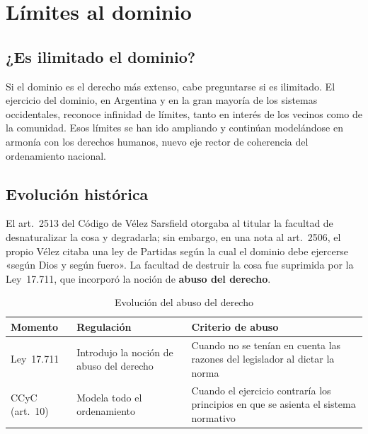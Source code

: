 \documentclass[12pt,oneside]{book}
\begin{document}
\chapter[Límites al dominio]{Límites al dominio}\label{cap:limites}

\section{¿Es ilimitado el dominio?}

Si el dominio es el derecho más extenso, cabe preguntarse si es ilimitado. El ejercicio del dominio, en Argentina y en la gran mayoría de los sistemas occidentales, reconoce infinidad de límites, tanto en interés de los vecinos como de la comunidad. Esos límites se han ido ampliando y continúan modelándose en armonía con los derechos humanos, nuevo eje rector de coherencia del ordenamiento nacional.

\section{Evolución histórica}

El art.~2513 del Código de Vélez Sarsfield otorgaba al titular la facultad de desnaturalizar la cosa y degradarla; sin embargo, en una nota al art.~2506, el propio Vélez citaba una ley de Partidas según la cual el dominio debe ejercerse «según Dios y según fuero». La facultad de destruir la cosa fue suprimida por la Ley~17.711, que incorporó la noción de \textbf{abuso del derecho}.

\begin{table}[H]
\centering
\small
\begin{tabularx}{\textwidth}{>{\raggedright\arraybackslash}p{}>{\raggedright\arraybackslash}X>{\raggedright\arraybackslash}X}
\toprule
\textbf{Momento} & \textbf{Regulación} & \textbf{Criterio de abuso} \\
\midrule
Ley~17.711 & Introdujo la noción de abuso del derecho & Cuando no se tenían en cuenta las razones del legislador al dictar la norma \\
CCyC (art.~10) & Modela todo el ordenamiento & Cuando el ejercicio contraría los principios en que se asienta el sistema normativo \\
\bottomrule
\end{tabularx}
\caption{Evolución del abuso del derecho}
\end{table}
\end{document}
